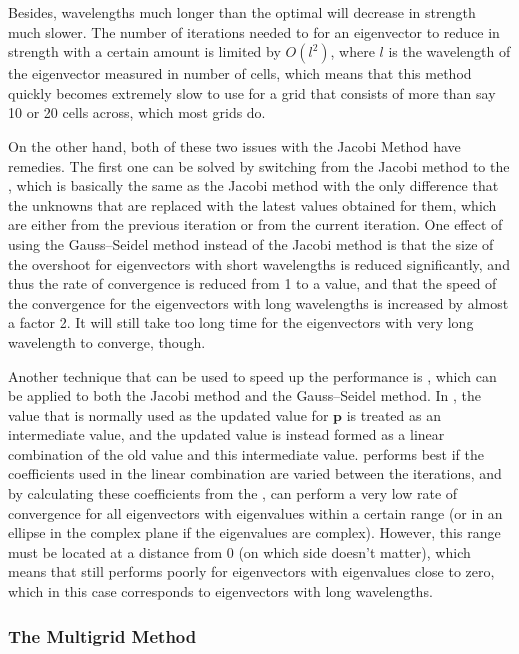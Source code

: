 Besides, wavelengths much longer than the optimal will decrease in strength much slower. The number of iterations needed to for an eigenvector to reduce in strength with a certain amount is limited by $O(l^2)$, where $l$ is the wavelength of the eigenvector measured in number of cells, which means that this method quickly becomes extremely slow to use for a grid that consists of more than say 10 or 20 cells across, which most grids do.

On the other hand, both of these two issues with the Jacobi Method have remedies. The first one can be solved by switching from the Jacobi method to the , which is basically the same as the Jacobi method with the only difference that the unknowns that are replaced with the latest values obtained for them, which are either from the previous iteration or from the current iteration. One effect of using the Gauss--Seidel method instead of the Jacobi method is that the size of the overshoot for eigenvectors with short wavelengths is reduced significantly, and thus the rate of convergence is reduced from 1 to a value, and that the speed of the convergence for the eigenvectors with long wavelengths is increased by almost a factor 2. It will still take too long time for the eigenvectors with very long wavelength to converge, though.

Another technique that can be used to speed up the performance is \SOR, which can be applied to both the Jacobi method and the Gauss--Seidel method. In \SOR, the value that is normally used as the updated value for $\mathbf{p}$ is treated as an intermediate value, and the updated value is instead formed as a linear combination of the old value and this intermediate value. \SOR performs best if the coefficients used in the linear combination are varied between the iterations, and by calculating these coefficients from the , \SOR can perform a very low rate of convergence for all eigenvectors with eigenvalues within a certain range (or in an ellipse in the complex plane if the eigenvalues are complex). However, this range must be located at a distance from 0 (on which side doesn't matter), which means that \SOR still performs poorly for eigenvectors with eigenvalues close to zero, which in this case corresponds to eigenvectors with long wavelengths.


\subsubsection{The Multigrid Method}

